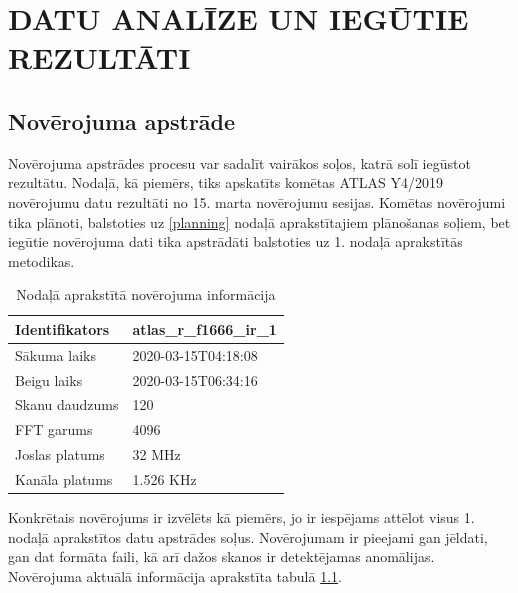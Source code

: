 \chapter{DATU ANALĪZE UN IEGŪTIE REZULTĀTI}





\section{Novērojuma apstrāde} \label{data-process}
Novērojuma apstrādes procesu var sadalīt vairākos soļos, katrā solī iegūstot rezultātu. Nodaļā, kā piemērs, tiks apskatīts komētas ATLAS Y4/2019 novērojumu datu rezultāti no 15. marta novērojumu sesijas.
Komētas novērojumi tika plānoti, balstoties uz \ref{planning} nodaļā aprakstītajiem plānošanas soļiem, bet iegūtie novērojuma dati tika apstrādāti balstoties uz 1. nodaļā aprakstītās metodikas. 

\begin{table}
        \caption{Nodaļā aprakstītā novērojuma informācija}
    \centering
        \begin{tabular}{|l|l|}
        \hline
        Identifikators & atlas\_r\_f1666\_ir\_1 \\ \hline
        Sākuma laiks   & 2020-03-15T04:18:08    \\ \hline
        Beigu laiks    & 2020-03-15T06:34:16    \\ \hline
        Skanu daudzums & 120                    \\ \hline
        FFT garums     & 4096                   \\ \hline
        Joslas platums & 32 MHz                 \\ \hline
        Kanāla platums & 1.526 KHz              \\ \hline
        \end{tabular}
        \label{tab:example-atlas}
\end{table}

Konkrētais novērojums ir izvēlēts kā piemērs, jo ir iespējams attēlot visus 1. nodaļā aprakstītos datu apstrādes soļus. Novērojumam ir pieejami gan jēldati, gan dat formāta faili, kā arī dažos skanos ir detektējamas anomālijas. Novērojuma aktuālā informācija aprakstīta tabulā \ref{tab:example-atlas}.





